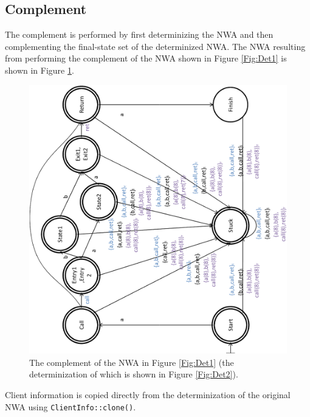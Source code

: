 


\subsection{Complement}
\label{Se:Complement}

The complement is performed by first determinizing the NWA and then
complementing the final-state set of the determinized NWA.  The NWA resulting
from performing the complement of the NWA shown in Figure \ref{Fig:Det1} is
shown in Figure \ref{Fig:Comp1}.

\begin{figure}[p]
  \centering
    \includegraphics[width=12cm]{Figures/Figure20}
  \caption{The complement of the NWA in Figure \ref{Fig:Det1} (the
    determinization of which is shown in Figure \ref{Fig:Det2}).}
  \label{Fig:Comp1}
\end{figure}

Client information is copied directly
from the determinization of the original NWA using \texttt{ClientInfo::clone()}.


